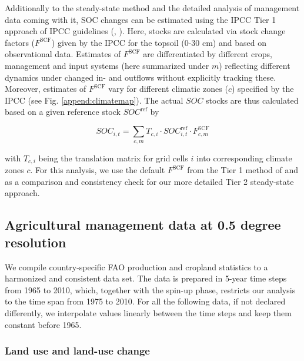 \documentclass[gc, manuscript]{copernicus}
\begin{document}
Additionally to the steady-state method \citep{calvo_buendia_ipcc_2019} and the detailed analysis of management data coming with it, SOC changes can be estimated using the IPCC Tier 1 approach of IPCC guidelines (\citep{eggleston_hs_ipcc_2006}, \citep{calvo_buendia_ipcc_2019}). Here, stocks are calculated via stock change factors (\(F^{\mathrm{SCF}}\)) given by the IPCC for the topsoil (0-30 cm) and based on observational data. Estimates of \(F^{\mathrm{SCF}}\) are differentiated by different crops, management and input systems (here summarized under \(m\)) reflecting different dynamics under changed in- and outflows without explicitly tracking these. Moreover, estimates of \(F^{\mathrm{SCF}}\) vary for different climatic zones (\(c\)) specified by the IPCC (see Fig. \ref{append:climatemap}). The actual \(SOC\) stocks are thus calculated based on a given reference stock \(SOC^{\mathrm{ref}}\) by

\begin{equation}
SOC_{i,t} = \sum_{c,m} T_{c,i} \cdot SOC^{\mathrm{ref}}_{i,t} \cdot F^{\mathrm{SCF}}_{c,m}
\label{eq:tier1}
\end{equation}

with \(T_{c,i}\) being the translation matrix for grid cells \(i\) into corresponding climate zones \(c\). For this analysis, we use the default \(F^{\mathrm{SCF}}\) from the Tier 1 method of \citep{eggleston_hs_ipcc_2006} and \citep{calvo_buendia_ipcc_2019} as a comparison and consistency check for our more detailed Tier 2 steady-state approach.

\hypertarget{sec:agrimanagement}{%
\subsection{Agricultural management data at 0.5 degree resolution}\label{sec:agrimanagement}}

We compile country-specific FAO production and cropland statistics \citep{faostat_faostat_2016} to a harmonized and consistent data set. The data is prepared in 5-year time steps from 1965 to 2010, which, together with the spin-up phase, restricts our analysis to the time span from 1975 to 2010. For all the following data, if not declared differently, we interpolate values linearly between the time steps and keep them constant before 1965.

\hypertarget{sec:landuse}{%
\subsubsection{Land use and land-use change}\label{sec:landuse}}
\end{document}
